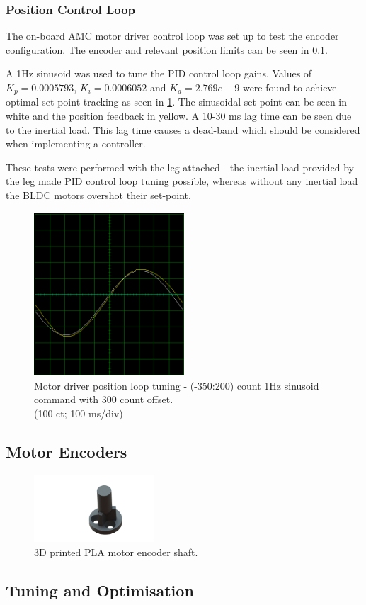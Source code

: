 \subsubsection{Position Control Loop}
The on-board AMC motor driver control loop was set up to test the encoder configuration. The encoder and relevant position limits can be seen in \cref{sec:motor-encoders}. 

A 1Hz sinusoid was used to tune the PID control loop gains. Values of $K_p = 0.0005793$, $K_i = 0.0006052$ and $K_d = 2.769e-9$ were found to achieve optimal set-point tracking as seen in \cref{fig:position-tuning-plots}. The sinusoidal set-point can be seen in white and the position feedback in yellow. A 10-30 ms lag time can be seen due to the inertial load. This lag time causes a dead-band which should be considered when implementing a controller. 

These tests were performed with the leg attached - the inertial load provided by the leg made PID control loop tuning possible, whereas without any inertial load the BLDC motors overshot their set-point.

\begin{figure}
\centering
\includegraphics[width=0.5\textwidth]{images/driveware/position-tuning-plot} 
\caption{Motor driver position loop tuning - (-350:200) count 1Hz sinusoid command with 300 count offset.\\(100 ct; 100 ms/div)}
\label{fig:position-tuning-plots}
\end{figure}

\subsection{Motor Encoders}
\label{sec:motor-encoders}

\begin{figure}
\centering
\includegraphics[clip, trim = 6cm 1cm 3cm 1cm, width=0.4\textwidth]{images/mechanical/encoder-shaft} 
\caption{3D printed PLA motor encoder shaft.}
\label{fig:encoder-shaft}
\end{figure} 

\subsection{Tuning and Optimisation}
